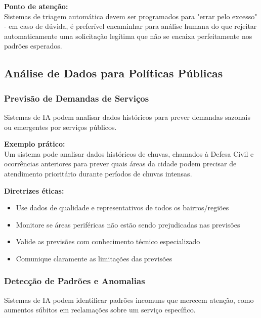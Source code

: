 \documentclass[12pt,a4paper]{article}
\begin{document}
\begin{tcolorbox}[warning]
\textbf{Ponto de atenção:} \\
Sistemas de triagem automática devem ser programados para "errar pelo excesso" - em caso de dúvida, é preferível encaminhar para análise humana do que rejeitar automaticamente uma solicitação legítima que não se encaixa perfeitamente nos padrões esperados.
\end{tcolorbox}

\subsection{Análise de Dados para Políticas Públicas}

\subsubsection{Previsão de Demandas de Serviços}
Sistemas de IA podem analisar dados históricos para prever demandas sazonais ou emergentes por serviços públicos.

\begin{tcolorbox}[example]
\textbf{Exemplo prático:} \\
Um sistema pode analisar dados históricos de chuvas, chamados à Defesa Civil e ocorrências anteriores para prever quais áreas da cidade podem precisar de atendimento prioritário durante períodos de chuvas intensas.
\end{tcolorbox}

\begin{tcolorbox}[highlight]
\textbf{Diretrizes éticas:}
\begin{itemize}
    \item Use dados de qualidade e representativos de todos os bairros/regiões
    \item Monitore se áreas periféricas não estão sendo prejudicadas nas previsões
    \item Valide as previsões com conhecimento técnico especializado 
    \item Comunique claramente as limitações das previsões
\end{itemize}
\end{tcolorbox}

\subsubsection{Detecção de Padrões e Anomalias}
Sistemas de IA podem identificar padrões incomuns que merecem atenção, como aumentos súbitos em reclamações sobre um serviço específico.
\end{document}
